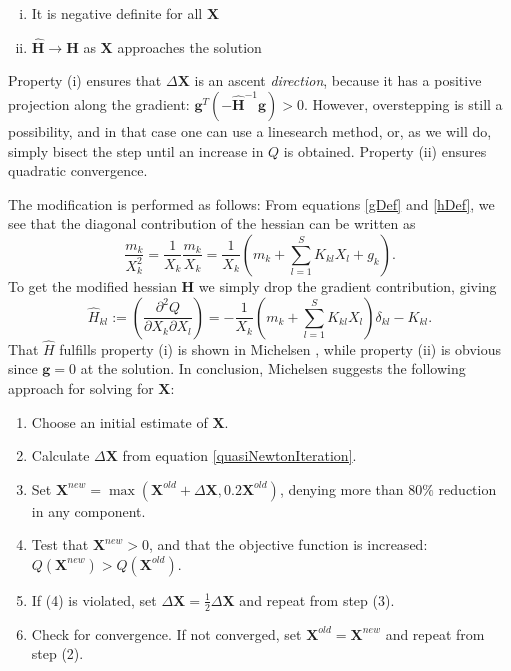 \documentclass[10pt, a4paper]{article}
\newcommand{\mbf}[0]{\mathbf}
\newcommand*{\pdcross}[3]{\left(\frac{\partial^2 #1}{\partial #2 \partial #3}\right)}
\newcommand{\lp}{\left(}
\newcommand{\rp}{\right)}
\begin{document}
\begin{enumerate}[(i)]
\item It is negative definite for all $\mbf X$
\item $\mbf{\hat H} \to \mbf H$ as $\mbf X$ approaches the solution
\end{enumerate}
Property (i) ensures that $\Delta \mbf X$ is an ascent \textit{direction}, because it has a positive projection along the gradient: $\mbf g^T (-\mbf{\hat H}^{-1} \mbf g) > 0$. However, overstepping is still a possibility, and in that case one can use a linesearch method, or, as we will do, simply bisect the step until an increase in $Q$ is obtained. Property (ii) ensures quadratic convergence.

The modification is performed as follows: From equations \eqref{gDef} and \eqref{hDef}, we see that the diagonal contribution of the hessian can be written as
$$
\frac{m_k}{X_k^2} = \frac{1}{X_k} \frac{m_k}{X_k} = \frac{1}{X_k} \lp m_k + \sum_{l=1}^S K_{kl} X_l + g_k \rp.
$$
To get the modified hessian $\mbf H$ we simply drop the gradient contribution, giving
\begin{equation}
  \hat H_{kl} := \pdcross{Q}{X_k}{X_l} = -\frac{1}{X_k} \lp m_k + \sum_{l=1}^S K_{kl} X_l \rp \delta_{kl} - K_{kl}.
\end{equation}
That $\hat H$ fulfills property (i) is shown in Michelsen \cite{Michelsen06}, while property (ii) is obvious since $\mbf g=0$ at the solution.
In conclusion, Michelsen \cite{Michelsen06} suggests the following approach for solving for $\mbf X$:
\begin{enumerate}[(1)]
\item Choose an initial estimate of $\mbf X$.
\item Calculate $\Delta \mbf X$ from equation \eqref{quasiNewtonIteration}.
\item Set $\mbf X^{new} = \max(\mbf X^{old} + \Delta \mbf X, 0.2 \mbf X^{old})$, denying more than $80 \%$ reduction in any component.
\item Test that $\mbf X^{new} > 0$, and that the objective function is increased: $Q(\mbf X^{new}) > Q(\mbf X^{old})$.
\item If (4) is violated, set $\Delta \mbf X = \tfrac{1}{2} \Delta \mbf X$ and repeat from step (3).
\item Check for convergence. If not converged, set $\mbf X^{old} = \mbf X^{new}$ and repeat from step (2).
\end{enumerate}
\end{document}
